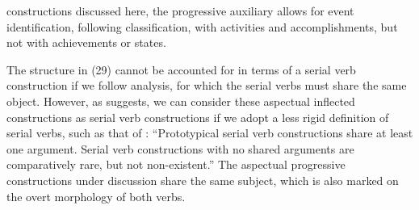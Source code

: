 \documentclass[output=paper]{langsci/langscibook}
\begin{document}
constructions discussed here, the progressive auxiliary allows for event identification, following  classification, with activities and accomplishments, but not with achievements or states.

\ea%
\label{ex:lorusso:38}
    \z
\z    

The structure in (29) cannot be accounted for in terms of a serial verb construction if we follow  analysis, for which the serial verbs must share the same object. However, as \citet{Cruschina2013} suggests, we can consider these aspectual inflected constructions as serial verb constructions if we adopt a less rigid definition of serial verbs, such as that of \citet[12]{Aikhenvald2006}: “Prototypical serial verb constructions share at least one argument. Serial verb constructions with no shared arguments are comparatively rare, but not non-existent.” The aspectual progressive constructions under discussion share the same subject, which is also marked on the overt morphology of both verbs. 
\end{document}
